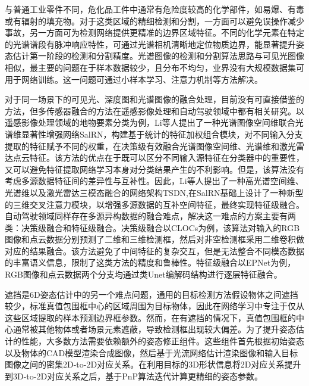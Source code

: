\documentclass[12pt]{article}
\begin{document}
与普通工业零件不同，危化品工件中通常有危险度较高的化学部件，如易爆、有毒或有辐射的填充物。对于这类区域的精细检测和分割，一方面可以避免误操作减少事故，另一方面可为检测网络提供更精准的边界区域特征。不同的化学元素在特定的光谱谱段有脉冲响应特性，可通过光谱相机清晰地定位物质边界，能显著提升姿态估计第一阶段的检测和分割精度。光谱图像的检测和分割算法思路与可见光图像相似，最主要的问题在于样本数据较少，且分布不均匀，业界没有大规模数据集可用于网络训练。这一问题可通过小样本学习\cite{lys2022targetDetection, shi2020HyperspectralTargetDetection}、注意力机制\cite{shi2020hyperspectralROI}等方法解决。

对于同一场景下的可见光、深度图和光谱图像的融合处理，目前没有可直接借鉴的方法，但多传感器融合的方法在遥感影像处理和自动驾驶领域中都有相关研究。以遥感影像处理领域的地物要素分类为例，Li等人\cite{li2022sal}提出了一种光谱图像空间维联合光谱维显著性增强网络SalRN，构建基于统计的特征加权组合模块，对不同输入分支提取的特征赋予不同的权重，在决策级有效融合光谱图像空间维、光谱维和激光雷达点云特征。该方法的优点在于既可以区分不同输入源特征在分类器中的重要性，又可以避免特征提取网络学习本身对分类结果产生的不利影响。但是，该算法没有考虑多源数据特征间的差异性与互补性。因此，Li等人\cite{li2022triplet}提出了一种高光谱空间维、光谱维以及激光雷达三模态融合的网络架构TSDN,在SalRN基础上设计了一种新型的三维交叉注意力模块，以增强多源数据的互补空间特征，最终实现特征级融合。自动驾驶领域同样存在多源异构数据的融合难点，解决这一难点的方案主要有两类：决策级融合和特征级融合。决策级融合以CLOCs为例\cite{pang2020clocs}，该算法对输入的RGB图像和点云数据分别预测了二维和三维检测框，然后对非空检测框采用二维卷积做对应的结果融合。该方法避免了中间特征的复杂交互，但是无法整合不同模态数据的丰富语义信息，限制了这类方法的精度和鲁棒性。特征级融合以EPNet为例\cite{huang2020epnet}，RGB图像和点云数据两个分支均通过类Unet编解码结构进行逐层特征融合。


遮挡是6D姿态估计中的另一个难点问题，通用的目标检测方法假设物体之间遮挡较少，标准真值包围框中心的区域周围为目标物体，因此在网络学习中专注于仅从这些区域提取的样本预测边界框参数。然而，在有遮挡的情况下，真值包围框的中心通常被其他物体或者场景元素遮蔽，导致检测框出现较大偏差。为了提升姿态估计的性能，大多数方法需要依赖额外的姿态修正组件。这些组件首先根据初始姿态以及物体的CAD模型渲染合成图像，然后基于光流网络估计渲染图像和输入目标图像之间的密集2D-to-2D对应关系。在利用目标的3D形状信息将2D对应关系提升到3D-to-2D对应关系之后，基于PnP算法迭代计算更精细的姿态参数。
\end{document}
